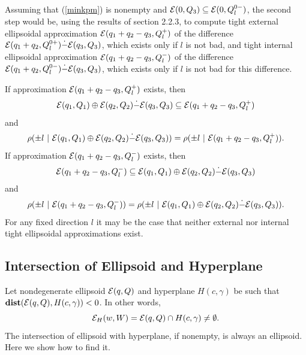 \documentclass{report}
\newcommand{\EE}{{\cal E}}
\begin{document}
Assuming that (\ref{minkpm}) is nonempty and
$\EE(0,Q_3)\subseteq\EE(0,Q_l^{0-})$, the second step would be, using the
results of section 2.2.3, to compute tight external ellipsoidal approximation
$\EE(q_1+q_2-q_3,Q_l^+)$ of the difference
$\EE(q_1+q_2,Q_l^{0+})\dot{-}\EE(q_3,Q_3)$, which exists only if $l$ is not
bad, and tight internal ellipsoidal approximation
$\EE(q_1+q_2-q_3,Q_l^-)$ of the difference
$\EE(q_1+q_2,Q_l^{0-})\dot{-}\EE(q_3,Q_3)$, which exists only if $l$ is not
bad for this difference.

If approximation $\EE(q_1+q_2-q_3,Q_l^+)$ exists, then
\[ \EE(q_1,Q_1)\oplus\EE(q_2,Q_2)\dot{-}\EE(q_3,Q_3) \subseteq
\EE(q_1+q_2-q_3,Q_l^+) \]
and
\[ \rho(\pm l ~|~ \EE(q_1,Q_1)\oplus\EE(q_2,Q_2)\dot{-}\EE(q_3,Q_3)) =
\rho(\pm l ~|~ \EE(q_1+q_2-q_3,Q_l^+)). \]
If approximation $\EE(q_1+q_2-q_3,Q_l^-)$ exists, then
\[ \EE(q_1+q_2-q_3,Q_l^-) \subseteq
\EE(q_1,Q_1)\oplus\EE(q_2,Q_2)\dot{-}\EE(q_3,Q_3) \]
and
\[ \rho(\pm l ~|~\EE(q_1+q_2-q_3,Q_l^-)) =
\rho(\pm l ~|~ \EE(q_1,Q_1)\oplus\EE(q_2,Q_2)\dot{-}\EE(q_3,Q_3)) . \]
For any fixed direction $l$ it may be the case that neither external nor
internal tight ellipsoidal approximations exist.


\subsection{Intersection of Ellipsoid and Hyperplane}
Let nondegenerate ellipsoid $\EE(q,Q)$ and hyperplane $H(c,\gamma)$ be such that
${\bf dist}(\EE(q,Q),H(c,\gamma))<0$. In other words,
\[ \EE_H(w,W) = \EE(q,Q)\cap H(c,\gamma) \neq \emptyset .\]
The intersection of ellipsoid with hyperplane, if nonempty, is always an
ellipsoid. Here we show how to find it.
\end{document}
